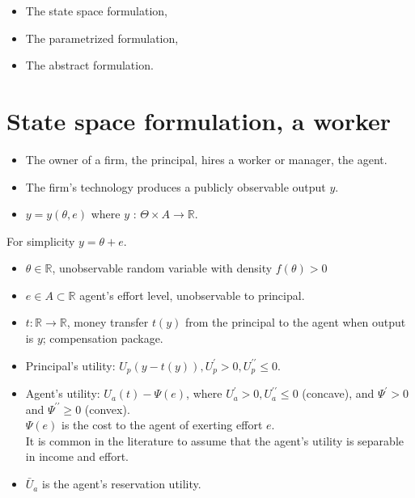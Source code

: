 \documentclass[10pt]{article}
\begin{document}
\begin{itemize}
  \item The state space formulation,
  \item The parametrized formulation,
  \item The abstract formulation.
\end{itemize}

\section*{State space formulation, a worker}
\begin{itemize}
  \item The owner of a firm, the principal, hires a worker or manager, the agent.
  \item The firm's technology produces a publicly observable output $y$.
  \item $y=y(\theta, e)$ where $y$ : $\Theta \times A \rightarrow \mathbb{R}$.
\end{itemize}

For simplicity $y=\theta+e$.

\begin{itemize}
  \item $\theta \in \mathbb{R}$, unobservable random variable with density $f(\theta)>0$
  \item $e \in A \subset \mathbb{R}$ agent's effort level, unobservable to principal.
  \item $t: \mathbb{R} \rightarrow \mathbb{R}$, money transfer $t(y)$ from the principal to the agent when output is $y$; compensation package.
  \item Principal's utility: $U_{p}(y-t(y)), U_{p}^{\prime}>0, U_{p}^{\prime \prime} \leq 0$.
  \item Agent's utility: $U_{a}(t)-\Psi(e)$, where $U_{a}^{\prime}>0, U_{a}^{\prime \prime} \leq 0$ (concave), and $\Psi^{\prime}>0$ and $\Psi^{\prime \prime} \geq 0$ (convex).\\
$\Psi(e)$ is the cost to the agent of exerting effort $e$.\\
It is common in the literature to assume that the agent's utility is separable in income and effort.
  \item $\bar{U}_{a}$ is the agent's reservation utility.
\end{itemize}
\end{document}
